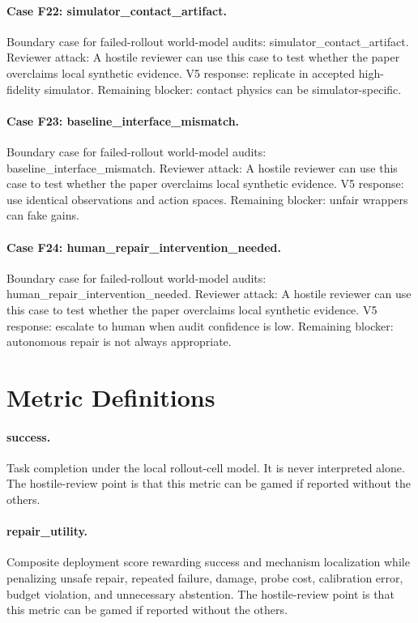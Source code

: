 \documentclass{article}
\begin{document}
\paragraph{Case F22: simulator\_contact\_artifact.} Boundary case for failed-rollout world-model audits: simulator\_contact\_artifact. Reviewer attack: A hostile reviewer can use this case to test whether the paper overclaims local synthetic evidence. V5 response: replicate in accepted high-fidelity simulator. Remaining blocker: contact physics can be simulator-specific.
\paragraph{Case F23: baseline\_interface\_mismatch.} Boundary case for failed-rollout world-model audits: baseline\_interface\_mismatch. Reviewer attack: A hostile reviewer can use this case to test whether the paper overclaims local synthetic evidence. V5 response: use identical observations and action spaces. Remaining blocker: unfair wrappers can fake gains.
\paragraph{Case F24: human\_repair\_intervention\_needed.} Boundary case for failed-rollout world-model audits: human\_repair\_intervention\_needed. Reviewer attack: A hostile reviewer can use this case to test whether the paper overclaims local synthetic evidence. V5 response: escalate to human when audit confidence is low. Remaining blocker: autonomous repair is not always appropriate.
\clearpage
\section{Metric Definitions}
\paragraph{success.} Task completion under the local rollout-cell model. It is never interpreted alone. The hostile-review point is that this metric can be gamed if reported without the others.
\paragraph{repair\_utility.} Composite deployment score rewarding success and mechanism localization while penalizing unsafe repair, repeated failure, damage, probe cost, calibration error, budget violation, and unnecessary abstention. The hostile-review point is that this metric can be gamed if reported without the others.
\end{document}
